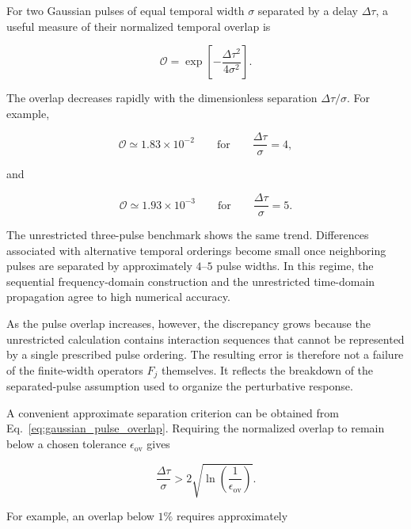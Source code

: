 \documentclass[11pt]{article}
\begin{document}
For two Gaussian pulses of equal temporal width $\sigma$ separated by
a delay $\Delta\tau$, a useful measure of their normalized temporal
overlap is

\begin{equation}
\boxed{
\mathcal{O}
=
\exp\left[
-\frac{
\Delta\tau^2
}{
4\sigma^2
}
\right].
}
\label{eq:gaussian_pulse_overlap}
\end{equation}

The overlap decreases rapidly with the dimensionless separation
$\Delta\tau/\sigma$.  For example,

\begin{equation}
\mathcal{O}
\simeq
1.83\times10^{-2}
\qquad
\text{for}
\qquad
\frac{\Delta\tau}{\sigma}=4,
\end{equation}

and

\begin{equation}
\mathcal{O}
\simeq
1.93\times10^{-3}
\qquad
\text{for}
\qquad
\frac{\Delta\tau}{\sigma}=5.
\end{equation}

The unrestricted three-pulse benchmark shows the same trend.
Differences associated with alternative temporal orderings become
small once neighboring pulses are separated by approximately
$4$--$5$ pulse widths.  In this regime, the sequential
frequency-domain construction and the unrestricted time-domain
propagation agree to high numerical accuracy.

As the pulse overlap increases, however, the discrepancy grows because
the unrestricted calculation contains interaction sequences that
cannot be represented by a single prescribed pulse ordering.  The
resulting error is therefore not a failure of the finite-width
operators $F_j$ themselves.  It reflects the breakdown of the
separated-pulse assumption used to organize the perturbative response.

A convenient approximate separation criterion can be obtained from
Eq.~\eqref{eq:gaussian_pulse_overlap}.  Requiring the normalized overlap
to remain below a chosen tolerance $\epsilon_{\mathrm{ov}}$ gives

\begin{equation}
\boxed{
\frac{
\Delta\tau
}{
\sigma
}
>
2
\sqrt{
\ln
\left(
\frac{1}{
\epsilon_{\mathrm{ov}}
}
\right)
}.
}
\label{eq:pulse_overlap_criterion}
\end{equation}

For example, an overlap below $1\%$ requires approximately
\end{document}
